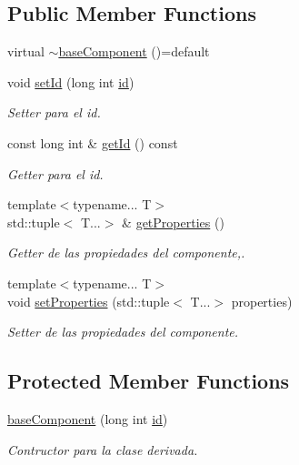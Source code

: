 \subsection*{Public Member Functions}
\begin{DoxyCompactItemize}
\item 
virtual \hyperlink{classant_1_1base_component_a661d33dcb2f1c52ef7a8b080be14eb79}{$\sim$base\+Component} ()=default
\item 
void \hyperlink{classant_1_1base_component_ae033339154fcd331683f5864741b9bba}{set\+Id} (long int \hyperlink{classant_1_1base_component_a27d4ac318ff9a3aa9e7be2391dbb85be}{id})
\begin{DoxyCompactList}\small\item\em Setter para el id. \end{DoxyCompactList}\item 
const long int \& \hyperlink{classant_1_1base_component_a497d74829d42df8216d4ea0c2d351335}{get\+Id} () const 
\begin{DoxyCompactList}\small\item\em Getter para el id. \end{DoxyCompactList}\item 
{\footnotesize template$<$typename... T$>$ }\\std\+::tuple$<$ T...$>$ \& \hyperlink{classant_1_1base_component_a88bc0531ed99c8978e95257131653efe}{get\+Properties} ()
\begin{DoxyCompactList}\small\item\em Getter de las propiedades del componente,. \end{DoxyCompactList}\item 
{\footnotesize template$<$typename... T$>$ }\\void \hyperlink{classant_1_1base_component_a85aa249d86676f21407ddc7ef321c6c4}{set\+Properties} (std\+::tuple$<$ T...$>$ properties)
\begin{DoxyCompactList}\small\item\em Setter de las propiedades del componente. \end{DoxyCompactList}\end{DoxyCompactItemize}
\subsection*{Protected Member Functions}
\begin{DoxyCompactItemize}
\item 
\hyperlink{classant_1_1base_component_a8033039184654f8e1337bc78d3299d57}{base\+Component} (long int \hyperlink{classant_1_1base_component_a27d4ac318ff9a3aa9e7be2391dbb85be}{id})
\begin{DoxyCompactList}\small\item\em Contructor para la clase derivada. \end{DoxyCompactList}\end{DoxyCompactItemize}
